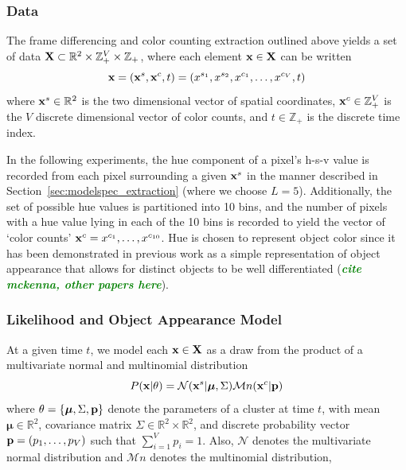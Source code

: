 \documentclass{article}
\newcommand{\willie}[1]{\textcolor{green}{\textsf{\emph{\textbf{\textcolor{green}{#1}}}}}}
\begin{document}
\subsubsection{Data}

The frame differencing and color counting extraction outlined above yields a set of data $\bold{X} \subset \mathbb{R}^{2} \times \mathbb{Z}_{+}^{V} \times \mathbb{Z}_{+}$, where each element $\bold{x} \in \bold{X}$ can be written
\begin{equation}
\bold{x} = ( \bold{x}^{s}, \bold{x}^{c}, t ) = ( x^{s_{1}}, x^{s_{2}}, x^{c_{1}}, \ldots, x^{c_{V}}, t )
\end{equation}
where $\bold{x}^{s} \in \mathbb{R}^{2}$ is the two dimensional vector of spatial coordinates,  $\bold{x}^{c} \in \mathbb{Z}_{+}^{V}$ is the $V$ discrete dimensional vector of color counts, and $t \in \mathbb{Z}_{+}$ is the discrete time index. 

In the following experiments, the hue component of a pixel's h-s-v value is recorded from each pixel surrounding a given $\bold{x}^{s}$ in the manner described in Section~\ref{sec:modelspec_extraction} (where we choose $L=5$). Additionally, the set of possible hue values is partitioned into 10 bins, and the number of pixels with a hue value lying in each of the 10 bins is recorded to yield the vector of `color counts' $\bold{x}^{c} = x^{c_{1}}, \ldots, x^{c_{10}}$. Hue is chosen to represent object color since it has been demonstrated in previous work as a simple representation of object appearance that allows for distinct objects to be well differentiated (\willie{cite mckenna, other papers here}).



\subsubsection{Likelihood and Object Appearance Model}

At a given time $t$, we model each $\bold{x} \in \bold{X}$ as a draw from the product of a multivariate normal and multinomial distribution
\begin{equation}
P(\bold{x}|\theta) = \mathcal{N}(\bold{x}^{s} | \boldsymbol{\mu}, \Sigma)  \mathcal{M}n(\bold{x}^{c} | \bold{p})
\end{equation}
where $\theta = \{ \boldsymbol{\mu}, \Sigma, \bold{p} \}$ denote the parameters of a cluster at time $t$, with mean $\boldsymbol{\mu} \in \mathbb{R}^{2}$, covariance matrix $\Sigma \in \mathbb{R}^{2} \times \mathbb{R}^{2}$, and discrete probability vector $\bold{p} = (p_{1}, \ldots, p_{V})$ such that $\sum_{i=1}^{V}p_{i} = 1$. Also, $\mathcal{N}$ denotes the multivariate normal distribution and $\mathcal{M}n$ denotes the multinomial distribution, 
\end{document}
